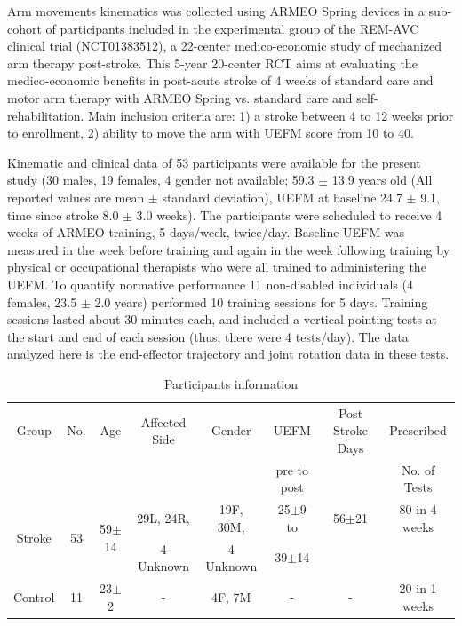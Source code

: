 Arm movements kinematics was collected using ARMEO Spring devices in a sub-cohort of participants included in the experimental group of the REM-AVC clinical trial (NCT01383512), a 22-center medico-economic study of mechanized arm therapy post-stroke. 
This 5-year 20-center RCT aims at evaluating the medico-economic benefits in post-acute stroke of 4 weeks of standard care and motor arm therapy with ARMEO Spring vs. standard care and self-rehabilitation. 
Main inclusion criteria are: 1) a stroke between 4 to 12 weeks prior to enrollment, 2) ability to move the arm with UEFM score from 10 to 40. 

Kinematic and clinical data of 53 participants were available for the present study (30 males, 19 females, 4 gender not available; 59.3 $\pm$ 13.9 years old (All reported values are mean $\pm$ standard deviation), UEFM at baseline 24.7 $\pm$ 9.1, time since stroke 8.0 $\pm$ 3.0 weeks). 
The participants were scheduled to receive 4 weeks of ARMEO training, 5 days/week, twice/day. 
Baseline UEFM was measured in the week before training and again in the week following training by physical or occupational therapists who were all trained to administering the UEFM. 
To quantify normative performance 11 non-disabled individuals (4 females, 23.5 $\pm$ 2.0 years) performed 10 training sessions for 5 days. 
Training sessions lasted about 30 minutes each, and included a vertical pointing tests at the start and end of each session (thus, there were 4 tests/day). 
The data analyzed here is the end-effector trajectory and joint rotation data in these tests.

\begin{table}[b]
\footnotesize
	\begin{tabular}{|c|c|c|c|c|c|c|c|}
		\hline
		Group & No. & Age & Affected Side & Gender & UEFM & Post Stroke Days & Prescribed \\
		&&&&&  pre to post & & No. of Tests		\\
		\hline
		\multirow{2}{*}{Stroke} & \multirow{2}{*}{53} & \multirow{2}{*}{59$\pm$14} & 29L, 24R, & 19F, 30M, & 25$\pm$9 to & 56$\pm$21 & 80 in 4 weeks \\ 
		&&& 4 Unknown & 4 Unknown & 39$\pm$14 && \\
		\hline
		Control & 11 & 23$\pm$2 & - & 4F, 7M & - & - & 20 in 1 weeks \\
		\hline
	\end{tabular}
	\caption{Participants information}
	\label{tab:demog}
\end{table}

